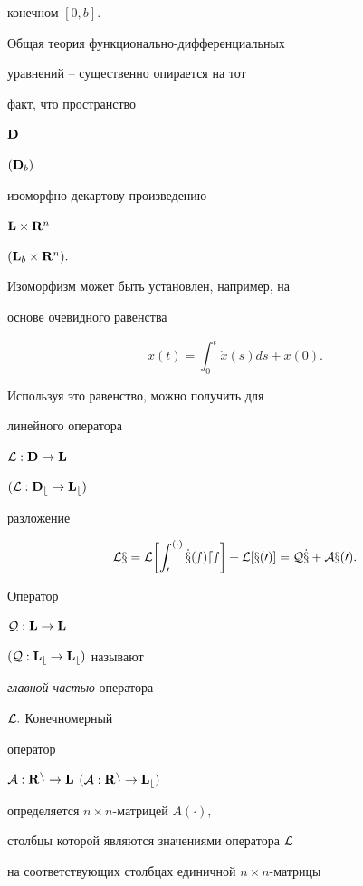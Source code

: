 конечном $[0,b].$





Общая теория функционально-дифференциальных


уравнений \cite{Az1}--\cite{Az5} существенно опирается на тот


факт, что пространство


$\bold D$


$(\bold D_b)$


изоморфно декартову произведению


$\bold L\times\bold R^n$


$(\bold L_b\times\bold R^n).$


Изоморфизм может быть установлен, например, на


основе очевидного равенства


\begin{equation}


x(t) =\int_0^t \Dot x (s)ds + x(0).


\end{equation}


Используя это равенство, можно получить для


линейного оператора


$\cal L:\bold D\to\bold L$


$(\cal L:\bold D_b\to\bold L_b)$


разложение


$$


\cal L x = \cal L\biggl [\int_0^{(\cdot)}\Dot x (s)ds\biggr ] +


\cal L[x(0)] = \cal Q\Dot x +\cal A x(0).


$$





Оператор


$\cal Q:\bold L\to\bold L$


$(\cal Q:\bold L_b\to\bold L_b)$ называют


{\it главной частью} оператора


${\cal L}.$ Конечномерный


оператор


$\cal A:\bold R^n\to\bold L$ $(\cal A:\bold R^n\to\bold L_b)$


определяется $n\times n$-матрицей $A(\cdot),$


столбцы которой являются значениями оператора $\cal L$


на соответствующих столбцах единичной $n\times n$-матрицы


